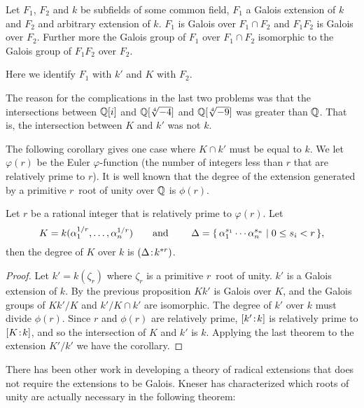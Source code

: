 \begin{proposition}
Let $F_1$, $F_2$ and $k$ be subfields of some common field, $F_1$ a Galois
extension of $k$ and $F_2$ and arbitrary extension of $k$.  $F_1$ is Galois
over $F_1 \cap F_2$ and $F_1 F_2$ is Galois over $F_2$.  Further more the
Galois group of $F_1$ over $F_1 \cap F_2$ isomorphic to the Galois group of
$F_1 F_2$ over $F_2$.
\end{proposition}

Here we identify $F_1$ with $k'$ and $K$ with $F_2$.

The reason for the complications in the last two problems was that the
intersections between $\mathbb{Q}[i]$ and $\Q[\root4\of{-4}]$ and
$\Q[\root4\of{-9}]$ was greater than $\mathbb{Q}$.  That is, the
intersection between $K$ and $k'$ was not $k$.

The following corollary gives one case where $K \cap k'$ must be equal
to $k$.  We let $\varphi(r)$ be the Euler $\varphi$-function (the number
of integers less than $r$ that are relatively prime to $r$).  It is
well known that the degree of the extension generated by a primitive
$r$\th\ root of unity over $\mathbb{Q}$ is $\phi(r)$.

\begin{corollary} Let $r$ be a rational integer that is relatively
prime to $\varphi(r)$.  Let
\[
K = k(\alpha_1^{1/r}, \ldots, \alpha_n^{1/r})
\qquad\hbox{and }\qquad
\Delta = \{\,\alpha_1^{s_1} \cdots \alpha_n^{s_n} \mid 0 \le s_i < r\,\},
\]
then the degree of $K$ over $k$ is $(\Delta\!:\!k^{\ast r})$.
\end{corollary}

\begin{proof}
Let $k' = k(\zeta_r)$ where $\zeta_r$ is a primitive $r$\th\ root of unity.
$k'$ is a Galois extension of $k$.  By the previous proposition $Kk'$ is
Galois over $K$, and the Galois groups of $Kk'/K$ and $k'/K\cap k'$ are
isomorphic.  The degree of $k'$ over $k$ must divide $\phi(r)$.  Since $r$
and $\phi(r)$ are relatively prime, $[k'\!:\!k]$ is relatively
prime to $[K\!:\!k]$, and so the intersection of $K$ and $k'$ is
$k$.  Applying the last theorem to the extension $K'/ k'$ we have the
corollary.
\end{proof}

There has been other work in developing a theory of radical extensions that
does not require the extensions to be Galois.  Kneser
\cite{Kneser:Radicals} has characterized which roots of unity are actually
necessary in the following theorem:

